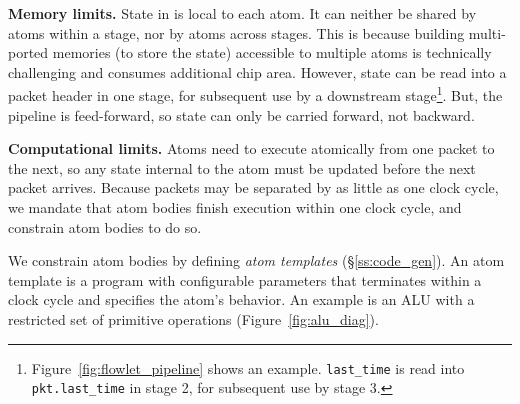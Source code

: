 \medskip
\noindent
\textbf{Memory limits.} State in \absmachine is local to each atom.  It can
neither be shared by atoms within a stage, nor by atoms across stages. This is
because building multi-ported memories (to store the state) accessible to
multiple atoms is technically challenging and consumes additional chip area.
However, state can be read into a packet header in one stage, for subsequent
use by a downstream stage\footnote{Figure~\ref{fig:flowlet_pipeline} shows an
example. {\tt last\_time} is read into {\tt pkt.last\_time} in stage 2, for
subsequent use by stage 3.}.  But, the \absmachine pipeline is feed-forward, so
state can only be carried forward, not backward.

\medskip
\noindent
\textbf{Computational limits.} Atoms need to execute atomically from one packet
to the next, so any state internal to the atom must be updated before the next
packet arrives.  Because packets may be separated by as little as one clock
cycle, we mandate that atom bodies finish execution within one clock cycle, and
constrain atom bodies to do so.

We constrain atom bodies by defining {\it atom templates}
(\S\ref{ss:code_gen}).  An atom template is a program with configurable
parameters that terminates within a clock cycle and specifies the atom's
behavior.  An example is an ALU with a restricted set of primitive operations
(Figure~\ref{fig:alu_diag}).



